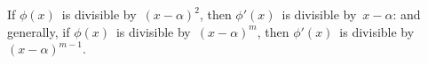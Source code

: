 If $\phi(x)$~is divisible by~$(x - \alpha)^{2}$, then $\phi'(x)$~is divisible by~$x - \alpha$: and
generally, if $\phi(x)$~is divisible by~$(x - \alpha)^{m}$, then $\phi'(x)$~is divisible by~$(x - \alpha)^{m-1}$.

